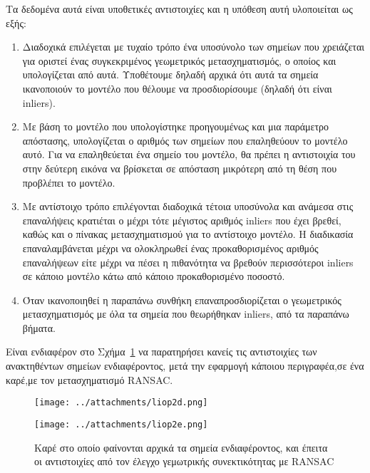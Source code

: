   Τα δεδομένα αυτά είναι υποθετικές αντιστοιχίες και η υπόθεση αυτή υλοποιείται ως εξής:
  
  \begin{enumerate}
    
  
 \item Διαδοχικά επιλέγεται με τυχαίο τρόπο ένα υποσύνολο των σημείων που χρειάζεται για οριστεί ένας συγκεκριμένος γεωμετρικός μετασχηματισμός, ο οποίος και υπολογίζεται από αυτά. Υποθέτουμε δηλαδή αρχικά ότι αυτά τα
  σημεία ικανοποιούν το μοντέλο που θέλουμε να προσδιορίσουμε (δηλαδή ότι είναι inliers).
 
 \item Με βάση το μοντέλο που υπολογίστηκε προηγουμένως και μια παράμετρο απόστασης, υπολογίζεται
 ο αριθμός των σημείων που επαληθεύουν το μοντέλο αυτό. Για να επαληθεύεται ένα σημείο του μοντέλο, θα πρέπει η αντιστοιχία του στην δεύτερη εικόνα να βρίσκεται σε απόσταση μικρότερη από τη θέση που προβλέπει το μοντέλο.
 
 \item Με αντίστοιχο τρόπο επιλέγονται διαδοχικά τέτοια υποσύνολα και ανάμεσα στις επαναλήψεις κρατιέται ο μέχρι τότε μέγιστος αριθμός inliers που έχει βρεθεί, καθώς και ο πίνακας μετασχηματισμού για το αντίστοιχο μοντέλο.
 Η διαδικασία επαναλαμβάνεται μέχρι να ολοκληρωθεί ένας προκαθορισμένος αριθμός επαναλήψεων είτε μέχρι να πέσει η πιθανότητα να βρεθούν περισσότεροι inliers σε κάποιο 
 μοντέλο κάτω από κάποιο προκαθορισμένο ποσοστό.
 
 \item Όταν ικανοποιηθεί η παραπάνω συνθήκη επαναπροσδιορίζεται ο γεωμετρικός μετασχηματισμός με όλα τα σημεία που θεωρήθηκαν inliers, από τα παραπάνω βήματα.
  
 \end{enumerate}

 
Είναι ενδιαφέρον στο Σχήμα~\ref{ransac_fig} να παρατηρήσει κανείς τις αντιστοιχίες των ανακτηθέντων σημείων ενδιαφέροντος, μετά την εφαρμογή κάποιου περιγραφέα,σε ένα καρέ,με τον μετασχηματισμό RANSAC.
 
\begin{figure}[!ht]
\begin{minipage}[b]{0.4\linewidth}
\centering
\texttt{[image: ../attachments/liop2d.png]}
\end{minipage}
\hspace{0.9cm}
\begin{minipage}[b]{0.7\linewidth}
\centering
\texttt{[image: ../attachments/liop2e.png]}
\end{minipage}

\caption{Καρέ στο οποίο φαίνονται αρχικά τα σημεία ενδιαφέροντος, και έπειτα οι αντιστοιχίες από τον έλεγχο γεμωτρικής συνεκτικότητας με RANSAC}
\label{ransac_fig}
\end{figure}
 
